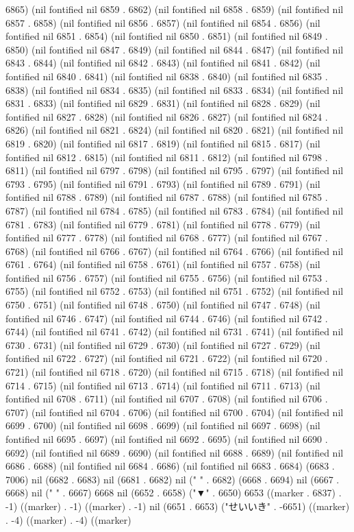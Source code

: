 6865) (nil fontified nil 6859 . 6862) (nil fontified nil 6858 . 6859) (nil fontified nil 6857 . 6858) (nil fontified nil 6856 . 6857) (nil fontified nil 6854 . 6856) (nil fontified nil 6851 . 6854) (nil fontified nil 6850 . 6851) (nil fontified nil 6849 . 6850) (nil fontified nil 6847 . 6849) (nil fontified nil 6844 . 6847) (nil fontified nil 6843 . 6844) (nil fontified nil 6842 . 6843) (nil fontified nil 6841 . 6842) (nil fontified nil 6840 . 6841) (nil fontified nil 6838 . 6840) (nil fontified nil 6835 . 6838) (nil fontified nil 6834 . 6835) (nil fontified nil 6833 . 6834) (nil fontified nil 6831 . 6833) (nil fontified nil 6829 . 6831) (nil fontified nil 6828 . 6829) (nil fontified nil 6827 . 6828) (nil fontified nil 6826 . 6827) (nil fontified nil 6824 . 6826) (nil fontified nil 6821 . 6824) (nil fontified nil 6820 . 6821) (nil fontified nil 6819 . 6820) (nil fontified nil 6817 . 6819) (nil fontified nil 6815 . 6817) (nil fontified nil 6812 . 6815) (nil fontified nil 6811 . 6812) (nil fontified nil 6798 . 6811) (nil fontified nil 6797 . 6798) (nil fontified nil 6795 . 6797) (nil fontified nil 6793 . 6795) (nil fontified nil 6791 . 6793) (nil fontified nil 6789 . 6791) (nil fontified nil 6788 . 6789) (nil fontified nil 6787 . 6788) (nil fontified nil 6785 . 6787) (nil fontified nil 6784 . 6785) (nil fontified nil 6783 . 6784) (nil fontified nil 6781 . 6783) (nil fontified nil 6779 . 6781) (nil fontified nil 6778 . 6779) (nil fontified nil 6777 . 6778) (nil fontified nil 6768 . 6777) (nil fontified nil 6767 . 6768) (nil fontified nil 6766 . 6767) (nil fontified nil 6764 . 6766) (nil fontified nil 6761 . 6764) (nil fontified nil 6758 . 6761) (nil fontified nil 6757 . 6758) (nil fontified nil 6756 . 6757) (nil fontified nil 6755 . 6756) (nil fontified nil 6753 . 6755) (nil fontified nil 6752 . 6753) (nil fontified nil 6751 . 6752) (nil fontified nil 6750 . 6751) (nil fontified nil 6748 . 6750) (nil fontified nil 6747 . 6748) (nil fontified nil 6746 . 6747) (nil fontified nil 6744 . 6746) (nil fontified nil 6742 . 6744) (nil fontified nil 6741 . 6742) (nil fontified nil 6731 . 6741) (nil fontified nil 6730 . 6731) (nil fontified nil 6729 . 6730) (nil fontified nil 6727 . 6729) (nil fontified nil 6722 . 6727) (nil fontified nil 6721 . 6722) (nil fontified nil 6720 . 6721) (nil fontified nil 6718 . 6720) (nil fontified nil 6715 . 6718) (nil fontified nil 6714 . 6715) (nil fontified nil 6713 . 6714) (nil fontified nil 6711 . 6713) (nil fontified nil 6708 . 6711) (nil fontified nil 6707 . 6708) (nil fontified nil 6706 . 6707) (nil fontified nil 6704 . 6706) (nil fontified nil 6700 . 6704) (nil fontified nil 6699 . 6700) (nil fontified nil 6698 . 6699) (nil fontified nil 6697 . 6698) (nil fontified nil 6695 . 6697) (nil fontified nil 6692 . 6695) (nil fontified nil 6690 . 6692) (nil fontified nil 6689 . 6690) (nil fontified nil 6688 . 6689) (nil fontified nil 6686 . 6688) (nil fontified nil 6684 . 6686) (nil fontified nil 6683 . 6684) (6683 . 7006) nil (6682 . 6683) nil (6681 . 6682) nil (" " . 6682) (6668 . 6694) nil (6667 . 6668) nil (" " . 6667) 6668 nil (6652 . 6658) ("▼" . 6650) 6653 ((marker . 6837) . -1) ((marker) . -1) ((marker) . -1) nil (6651 . 6653) ("せいいき" . -6651) ((marker) . -4) ((marker) . -4) ((marker) 